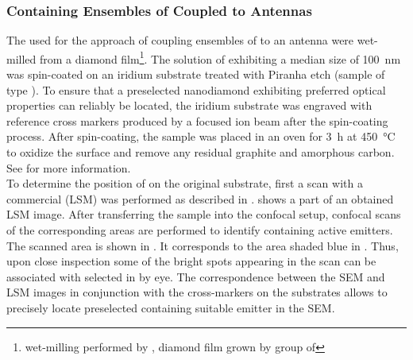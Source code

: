 		\subsubsection{\Nds Containing Ensembles of \sivs Coupled to Antennas}\label{subsubsec::antenna_multiple_sivs}

			The \nds used for the approach of coupling ensembles of \sivs to an antenna were wet-milled from a \CVD diamond film\footnote{wet-milling performed by \muzha, diamond film grown by group of \williams}.
			The solution of \nds exhibiting a median size of \SI{100}{nm} was spin-coated on an iridium substrate treated with Piranha etch (sample of type \insituH).
			To ensure that a preselected nanodiamond exhibiting preferred optical properties can reliably be located, the iridium substrate was engraved with reference cross markers produced by a focused ion beam after the spin-coating process.
			After spin-coating, the sample was placed in an oven for \SI{3}{\hour} at \SI{450}{\celsius} to oxidize the surface and remove any residual graphite and amorphous carbon. See  for more information.
			\\
			To determine the position of \nds on the original substrate, first a scan with a commercial \lsm (LSM) was performed as described in .
			 shows a part of an obtained LSM image.
			After transferring the sample into the confocal setup, confocal \fl scans of the corresponding areas are performed to identify \nds containing active emitters.
			The scanned area is shown in . It corresponds to the area shaded blue in . Thus, upon close inspection some of the bright spots appearing in the \fl scan can be associated with selected \nds in  by eye. The correspondence between the SEM and LSM images in conjunction with the cross-markers on the substrates allows to precisely locate preselected \nds containing suitable emitter in the SEM.


